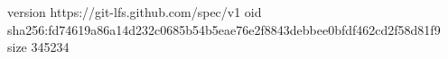 version https://git-lfs.github.com/spec/v1
oid sha256:fd74619a86a14d232c0685b54b5eae76e2f8843debbee0bfdf462cd2f58d81f9
size 345234
